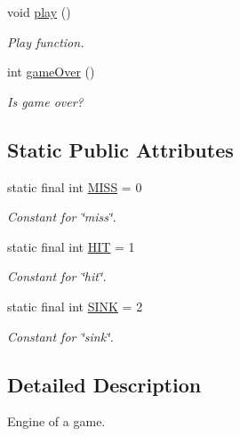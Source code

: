 \begin{DoxyCompactItemize}
void \hyperlink{classGame_afeae4232ad3b23d07dcccc383e14ff08}{play} ()
\begin{DoxyCompactList}\small\item\em Play function. \end{DoxyCompactList}\item 
int \hyperlink{classGame_a81bd2e305d61946b102ed5094d2fa6c0}{game\+Over} ()
\begin{DoxyCompactList}\small\item\em Is game over? \end{DoxyCompactList}\end{DoxyCompactItemize}
\subsection*{Static Public Attributes}
\begin{DoxyCompactItemize}
\item 
static final int \hyperlink{classGame_a66375c0a8f7f1a1480bd47221bc31917}{M\+I\+SS} = 0\hypertarget{classGame_a66375c0a8f7f1a1480bd47221bc31917}{}\label{classGame_a66375c0a8f7f1a1480bd47221bc31917}

\begin{DoxyCompactList}\small\item\em Constant for \char`\"{}miss\char`\"{}. \end{DoxyCompactList}\item 
static final int \hyperlink{classGame_a3840c1d15fa897a006516377a7f2e340}{H\+IT} = 1\hypertarget{classGame_a3840c1d15fa897a006516377a7f2e340}{}\label{classGame_a3840c1d15fa897a006516377a7f2e340}

\begin{DoxyCompactList}\small\item\em Constant for \char`\"{}hit\char`\"{}. \end{DoxyCompactList}\item 
static final int \hyperlink{classGame_a025eaf2e2b3235687cebe23b45f74467}{S\+I\+NK} = 2\hypertarget{classGame_a025eaf2e2b3235687cebe23b45f74467}{}\label{classGame_a025eaf2e2b3235687cebe23b45f74467}

\begin{DoxyCompactList}\small\item\em Constant for \char`\"{}sink\char`\"{}. \end{DoxyCompactList}\end{DoxyCompactItemize}


\subsection{Detailed Description}
Engine of a game. 

